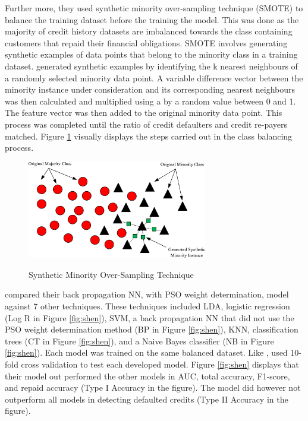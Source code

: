 Further more, they used synthetic minority over-sampling technique (SMOTE) to balance the training dataset before the training the model. This was done as the majority of  credit history datasets are imbalanced towards the class containing customers that repaid their financial obligations. SMOTE involves generating synthetic examples of data points that belong to the minority class in a training dataset. \textcite{NNShen} generated synthetic examples by identifying the k nearest neighbours of a randomly selected minority data point. A variable difference vector between the minority instance under consideration and its corresponding nearest neighbours was then calculated and multiplied using a by a random value between 0 and 1. The feature vector was then added to the original minority data point. This process was completed until the ratio of credit defaulters and credit re-payers matched. Figure \ref{fig:smote} visually displays the steps carried out in the class balancing process. 

\vspace{15pt}

\begin{figure}[!htb]
\centering
\includegraphics[width=0.7\textwidth]{images/smote.jpg}
\caption{Synthetic Minority Over-Sampling Technique}
\parencite{NNShen}
\label{fig:smote}
\end{figure}

\vspace{15pt}

\textcite{NNShen} compared their back propagation NN, with PSO weight determination, model against 7 other techniques. These techniques included LDA, logistic regression (Log R in Figure \ref{fig:shen}), SVM, a back propagation NN that did not use the PSO weight determination method (BP in Figure \ref{fig:shen}), KNN, classification trees (CT in Figure \ref{fig:shen}), and a Naive Bayes classifier (NB in Figure \ref{fig:shen}). Each model was trained on the same balanced dataset. Like \textcite{NNWest}, \textcite{NNShen} used 10-fold cross validation to test each developed model. Figure \ref{fig:shen} displays that their model out performed the other models in AUC, total accuracy, F1-score, and repaid accuracy (Type I Accuracy in the figure). The model did however not outperform all models in detecting defaulted credits (Type II Accuracy in the figure). 

